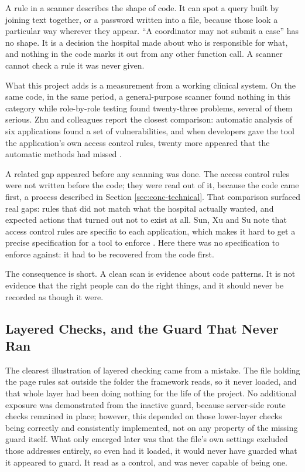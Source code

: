 A rule in a scanner describes the shape of code. It can spot a query built by joining text together, or a password written into a file, because those look a particular way wherever they appear. ``A coordinator may not submit a case'' has no shape. It is a decision the hospital made about who is responsible for what, and nothing in the code marks it out from any other function call. A scanner cannot check a rule it was never given.

What this project adds is a measurement from a working clinical system. On the same code, in the same period, a general-purpose scanner found nothing in this category while role-by-role testing found twenty-three problems, several of them serious. Zhu and colleagues report the closest comparison: automatic analysis of six applications found a set of vulnerabilities, and when developers gave the tool the application's own access control rules, twenty more appeared that the automatic methods had missed \cite{zhu2015}.

A related gap appeared before any scanning was done. The access control rules were not written before the code; they were read out of it, because the code came first, a process described in Section \ref{sec:conc-technical}. That comparison surfaced real gaps: rules that did not match what the hospital actually wanted, and expected actions that turned out not to exist at all. Sun, Xu and Su note that access control rules are specific to each application, which makes it hard to get a precise specification for a tool to enforce \cite{sun2011}. Here there was no specification to enforce against: it had to be recovered from the code first.

The consequence is short. A clean scan is evidence about code patterns. It is not evidence that the right people can do the right things, and it should never be recorded as though it were.

\subsection{Layered Checks, and the Guard That Never Ran}
\label{sec:result-layered}

The clearest illustration of layered checking came from a mistake. The file holding the page rules sat outside the folder the framework reads, so it never loaded, and that whole layer had been doing nothing for the life of the project. No additional exposure was demonstrated from the inactive guard, because server-side route checks remained in place; however, this depended on those lower-layer checks being correctly and consistently implemented, not on any property of the missing guard itself. What only emerged later was that the file's own settings excluded those addresses entirely, so even had it loaded, it would never have guarded what it appeared to guard. It read as a control, and was never capable of being one.

